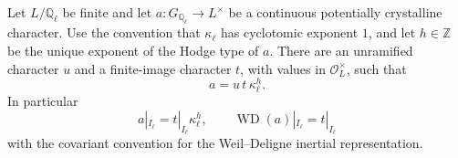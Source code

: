 \begin{lemma}
\label{AC-G55-character}
Let $L/\mathbb Q_\ell$ be finite and let
$a:G_{\mathbb Q_\ell}\to L^\times$ be a continuous
potentially crystalline character.
Use the convention that $\kappa_\ell$ has
cyclotomic exponent $1$, and let $h\in\mathbb Z$
be the unique exponent of the Hodge type of $a$.
There are an unramified character $u$ and a
finite-image character $t$, with values in
$\mathcal O_L^\times$, such that
\[
                  a=u\,t\,\kappa_\ell^h .
                                                               \tag{G55S.1}
\]
In particular
\[
             a|_{I_\ell}=t|_{I_\ell}\kappa_\ell^h,
       \qquad \operatorname{WD}(a)|_{I_\ell}=t|_{I_\ell}
                                                               \tag{G55S.2}
\]
with the covariant convention for the
Weil--Deligne inertial representation.
\end{lemma}
